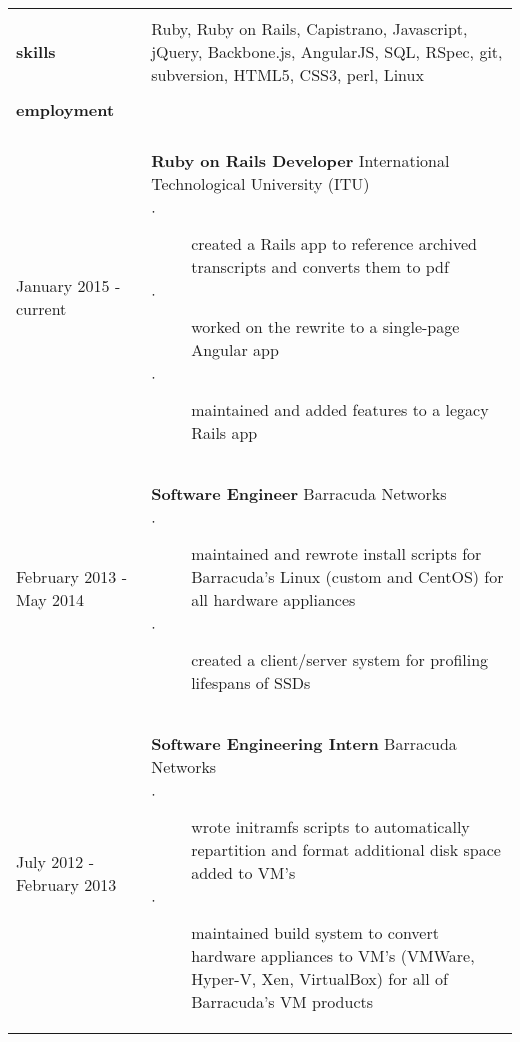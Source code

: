 \documentclass{article}
\begin{document}
\begin{tabular}{L{3cm} R{13.50cm}}

    \\ \hline \\

    \large{\textbf{skills}}
    \normalsize

    &

    Ruby, Ruby on Rails, Capistrano, Javascript, jQuery, Backbone.js, AngularJS, 
    SQL, RSpec, git, subversion, HTML5, CSS3, perl, Linux

    \\ \hline \\

    \large{\textbf{employment}} \\\\
    \normalsize

    January 2015 - current
    &
    \textbf{Ruby on Rails Developer}
    International Technological University (ITU)

    \begin{description}
        \item[$\cdot$] created a Rails app to reference archived
            transcripts and converts them to pdf 
        \item[$\cdot$] worked on the rewrite to a single-page Angular app
        \item[$\cdot$] maintained and added features to a legacy Rails app
    \end{description}

    \\

    February 2013 - May 2014
    &
    \textbf{Software Engineer}
    Barracuda Networks

    \begin{description}
        \item[$\cdot$] maintained and rewrote install scripts for Barracuda's Linux 
            (custom and CentOS) for all hardware appliances
        \item[$\cdot$] created a client/server system for profiling lifespans of
            SSDs
    \end{description}

    \\
    
    July 2012 - February 2013
    &
    \textbf{Software Engineering Intern}
    Barracuda Networks

    \begin{description}
        \item[$\cdot$] wrote initramfs scripts to automatically repartition and 
            format additional disk space added to VM's
        \item[$\cdot$] maintained build system to convert hardware appliances to VM's
            (VMWare, Hyper-V, Xen, VirtualBox) for all of Barracuda's VM products
    \end{description}


\end{tabular}
\end{document}
